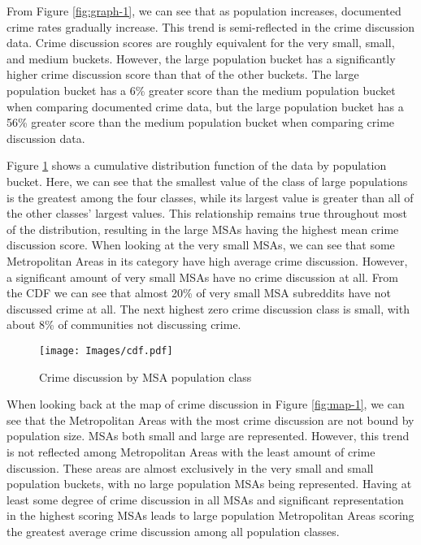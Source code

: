 \documentclass[12pt,oneside, letterpaper]{book}
\begin{document}
\par From Figure \ref{fig:graph-1}, we can see that as population increases, documented crime rates gradually increase. This trend is semi-reflected in the crime discussion data. Crime discussion scores are roughly equivalent for the very small, small, and medium buckets. However, the large population bucket has a significantly higher crime discussion score than that of the other buckets. The large population bucket has a 6\% greater score than the medium population bucket when comparing documented crime data, but the large population bucket has a 56\% greater score than the medium population bucket when comparing crime discussion data.

\par Figure \ref{fig:cdf-1} shows a cumulative distribution function of the data by population bucket. Here, we can see that the smallest value of the class of large populations is the greatest among the four classes, while its largest value is greater than all of the other classes' largest values. This relationship remains true throughout most of the distribution, resulting in the large MSAs having the highest mean crime discussion score. When looking at the very small MSAs, we can see that some Metropolitan Areas in its category have high average crime discussion. However, a significant amount of very small MSAs have no crime discussion at all. From the CDF we can see that almost 20\% of very small MSA subreddits have not discussed crime at all. The next highest zero crime discussion class is small, with about 8\% of communities not discussing crime.

\begin{figure}[ht]
    \centering
    \texttt{[image: Images/cdf.pdf]}
    \caption{Crime discussion by MSA population class}
    \label{fig:cdf-1}
\end{figure}

\par When looking back at the map of crime discussion in Figure \ref{fig:map-1}, we can see that the Metropolitan Areas with the most crime discussion are not bound by population size. MSAs both small and large are represented. However, this trend is not reflected among Metropolitan Areas with the least amount of crime discussion. These areas are almost exclusively in the very small and small population buckets, with no large population MSAs being represented. Having at least some degree of crime discussion in all MSAs and significant representation in the highest scoring MSAs leads to large population Metropolitan Areas scoring the greatest average crime discussion among all population classes.
\end{document}
